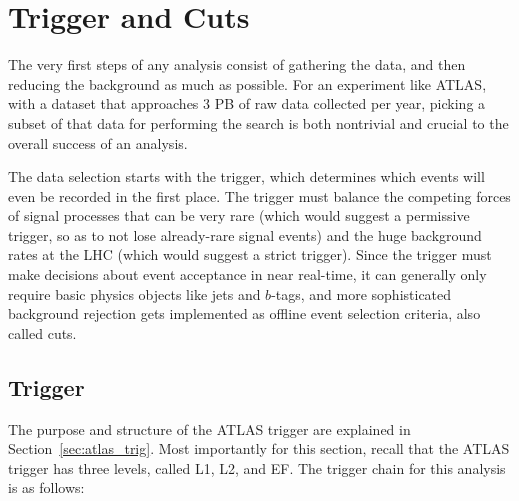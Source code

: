  

\chapter[Trigger and Cuts]{Trigger and Cuts}
\label{chap:trig_cuts}
The very first steps of any analysis consist of gathering the data, and then reducing the background
as much as possible.  For an experiment like ATLAS, with a dataset that approaches 3 PB of raw
data collected per year, picking a subset of that data for performing the search is both nontrivial
and crucial to the overall success of an analysis.  

The data selection starts with the trigger, which determines which events will even be recorded in the
first place.  The trigger must balance the competing forces of signal processes that can be very rare
(which would suggest a permissive trigger, so as to not lose already-rare signal events) and the
huge background rates at the LHC (which would suggest a strict trigger).  Since the trigger must make
decisions about event acceptance in near real-time, it can generally only require basic physics objects
like jets and $b$-tags, and more sophisticated background rejection gets implemented as offline event 
selection criteria, also called cuts.  

 
\section{Trigger}
\label{sec:my_trigger}
The purpose and structure of the ATLAS trigger are explained in Section~\ref{sec:atlas_trig}.
Most importantly for this section, recall that the ATLAS trigger has three levels, called L1,
L2, and EF.  The trigger chain for this analysis is as follows: 

